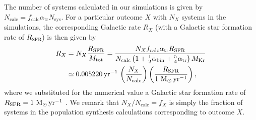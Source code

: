 \documentclass[twocolumn,appendixfloats,tighten]{aastex631}
\def\msun{{\rm\,M_\odot}}
\newcommand{\yr}{\mathrm{yr}}
\begin{document}
The number of systems calculated in our simulations is given by $N_\mathrm{calc} = f_\mathrm{calc} \alpha_\mathrm{tr} N_\mathrm{sys}$. For a particular outcome $X$ with $N_X$ systems in the simulations, the corresponding Galactic rate $R_X$ (with a Galactic star formation rate of $R_\mathrm{SFR}$) is then given by
\begin{align}
\nonumber R_X &= N_X \frac{R_\mathrm{SFR}}{M_\mathrm{tot}} = \frac{N_X f_\mathrm{calc} \alpha_\mathrm{tr} R_\mathrm{SFR}}{N_\mathrm{calc} \left (1 + \frac{1}{2} \alpha_\mathrm{bin} + \frac{5}{4} \alpha_\mathrm{tr} \right) M_\mathrm{Kr}} \\
&\simeq 0.005220 \, \yr^{-1} \, \left ( \frac{N_X}{N_\mathrm{calc}} \right )\left ( \frac{R_\mathrm{SFR}}{1 \, \msun \, \yr^{-1}} \right ),
\end{align}
where we substituted for the numerical value a Galactic star formation rate of $R_\mathrm{SFR} = 1\,\msun\,\yr^{-1}$ \citep{2010ApJ...710L..11R}. We remark that $N_X/N_\mathrm{calc} = f_X$ is simply the fraction of systems in the population synthesis calculations corresponding to outcome $X$. 
\end{document}
